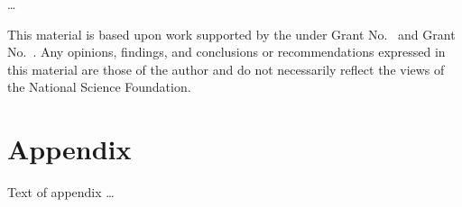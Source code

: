 \documentclass[acmsmall,review,anonymous]{acmart}\settopmatter{printfolios=true,printccs=false,printacmref=false}
\begin{document}
\ldots

\begin{acks}                            %
  This material is based upon work supported by the
   under Grant
  No.~ and Grant
  No.~.  Any opinions, findings, and
  conclusions or recommendations expressed in this material are those
  of the author and do not necessarily reflect the views of the
  National Science Foundation.
\end{acks}


%


\appendix
\section{Appendix}

Text of appendix \ldots
\end{document}
